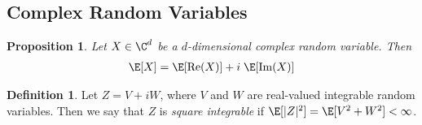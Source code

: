 \documentclass[12pt]{article}
\theoremstyle{plain}
\newtheorem{prop}[thm]{Proposition}
\theoremstyle{definition}
\newtheorem{defn}[thm]{Definition}
\theoremstyle{remark}
\renewcommand{\Re}{\operatorname{Re}}
\renewcommand{\Im}{\operatorname{Im}}
\begin{document}
\clearpage
\subsection{Complex Random Variables}

\begin{prop}
Let $X\in\C^d$ be a $d$-dimensional complex random variable. Then
\begin{align*}
  \E[X] = \E[\Re(X)] + i\;\E[\Im(X)]
\end{align*}
\end{prop}

\begin{defn}
Let $Z = V+iW$, where $V$ and $W$ are real-valued integrable random
variables. Then we say that $Z$ is \emph{square integrable} if
$\E[|Z|^2]=\E[V^2 + W^2]<\infty$.
\end{defn}
\end{document}
